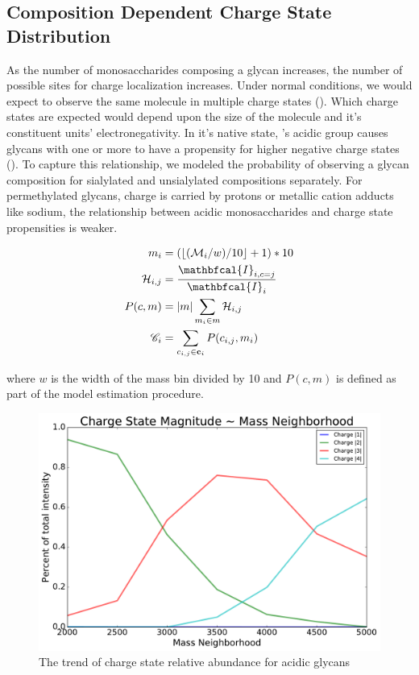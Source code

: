     \subsection{Composition Dependent Charge State Distribution}
        As the number of monosaccharides composing a glycan increases, the number of possible sites
        for charge localization increases. Under normal conditions, we would expect to observe the
        same molecule in multiple charge states (\cite{Maxwell2012}). Which charge states are
        expected would depend upon the size of the molecule and it's constituent units'
        electronegativity. In it's native state, 's acidic group causes
        glycans with one or more  to have a propensity for higher negative
        charge states (\cite{Varki2009}). To capture this relationship, we modeled the probability of
        observing a glycan composition for sialylated and unsialylated compositions separately. For
        permethylated glycans, charge is carried by protons or metallic cation adducts like sodium,
        the relationship between acidic monosaccharides and charge state propensities is weaker.

        \begin{align}
            m_i &= (\floor*{(\mathcal{M}_i / w) / 10} + 1) * 10 \nonumber\\
            \mathcal{H}_{i,j} &= \frac{
                \mathbfcal{I}_{i, c=j}}{\mathbfcal{I}_i} \nonumber\\
            P(c, m) &= |m|\sum_{m_i \in m} \mathcal{H}_{i, j} \nonumber\\
            \mathscr{C}_i &= \sum_{c_{i, j} \in \mathbf{c}_i}{P(c_{i, j}, m_i)}
        \end{align}

        \noindent where $w$ is the width of the mass bin divided by 10 and $P(c, m)$ is defined as
        part of the model estimation procedure.

        \begin{figure}
            \centering
            \includegraphics[width=0.75\linewidth]{figure/charge_trend_plot}
            \caption{The trend of charge state relative abundance for acidic glycans}
            \label{fig:charge_trend_plot}
        \end{figure}

